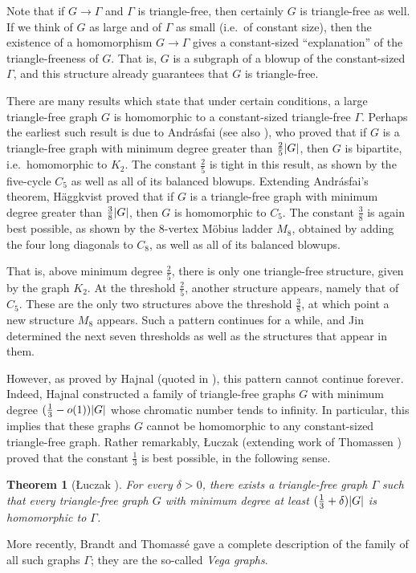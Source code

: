 \documentclass[reqno, english, 12pt]{amsart}
\theoremstyle{plain}
\newtheorem{theorem}{Theorem}[section]
\theoremstyle{remark}
\DeclarePairedDelimiter{\abs}{\lvert}{\rvert}
\begin{document}
Note that if $G \to \Gamma$ and $\Gamma$ is triangle-free, then certainly $G$ is triangle-free as well. If we think of $G$ as large and of $\Gamma$ as small (i.e.\ of constant size), then the existence of a homomorphism $G \to \Gamma$ gives a constant-sized ``explanation'' of the triangle-freeness of $G$. That is, $G$ is a subgraph of a blowup of the constant-sized $\Gamma$, and this structure already guarantees that $G$ is triangle-free.

There are many results which state that under certain conditions, a large triangle-free graph $G$ is homomorphic to a constant-sized triangle-free $\Gamma$. Perhaps the earliest such result is due to Andr\'asfai \cite{MR169227} (see also \cite{MR340075}), who proved that if $G$ is a triangle-free graph with minimum degree greater than $\frac 25 \abs G$, then $G$ is bipartite, i.e.\ homomorphic to $K_2$. The constant $\frac 25$ is tight in this result, as shown by the five-cycle $C_5$ as well as all of its balanced blowups. Extending Andr\'asfai's theorem, H\"aggkvist \cite{MR671908} proved that if $G$ is a triangle-free graph with minimum degree greater than $\frac 38 \abs G$, then $G$ is homomorphic to $C_5$. The constant $\frac 38$ is again best possible, as shown by the $8$-vertex M\"obius ladder $M_8$, obtained by adding the four long diagonals to $C_8$, as well as all of its balanced blowups.

That is, above minimum degree $\frac 25$, there is only one triangle-free structure, given by the graph $K_2$. At the threshold $\frac 25$, another structure appears, namely that of $C_5$. These are the only two structures above the threshold $\frac 38$, at which point a new structure $M_8$ appears. Such a pattern continues for a while, and Jin \cite{MR1264720} determined the next seven thresholds as well as the structures that appear in them. 

However, as proved by Hajnal (quoted in \cite{MR342429}), this pattern cannot continue forever. Indeed, Hajnal constructed a family of triangle-free graphs $G$ with minimum degree $(\frac 13 - o(1))\abs G$ whose chromatic number tends to infinity. In particular, this implies that these graphs $G$ cannot be homomorphic to any constant-sized triangle-free graph. Rather remarkably, \L uczak \cite{MR2260851} (extending work of Thomassen \cite{MR1956996}) proved that the constant $\frac 13$ is best possible, in the \nolinebreak following \nolinebreak sense.
\begin{theorem}[\L uczak \cite{MR2260851}]\label{thm:triangle hom threshold}
	For every $\delta>0$, there exists a triangle-free graph $\Gamma$ such that every triangle-free graph $G$ with minimum degree at least $(\frac 13 + \delta)\abs G$ is homomorphic to $\Gamma$.
\end{theorem}
More recently, Brandt and Thomass\'e \cite{brandtthomasse} gave a complete description of the family of all such graphs $\Gamma$; they are the so-called \emph{Vega graphs}.
\end{document}
